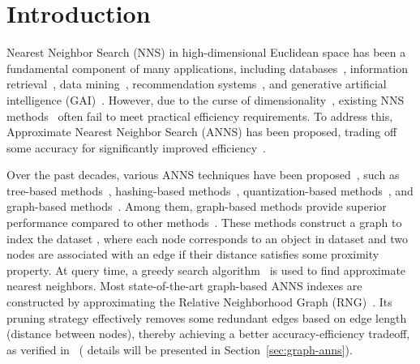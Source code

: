 \section{Introduction}
\label{sec:intro}
Nearest Neighbor Search (NNS) in high-dimensional Euclidean space has been a fundamental component of many applications, including {\cheng databases~\cite{milvus2021, pan2024vector}}, information retrieval~\cite{ANNForIR, ANNForDPR}, data mining~\cite{ANNForDM}, recommendation systems~\cite{ANNForRS}, and generative artificial intelligence (GAI)~\cite{zhao2024retrievalaugmented}. However, due to the curse of dimensionality~\cite{curse1, curse2}, existing NNS methods~\cite{Jagadishidistance2005} often fail to meet practical efficiency requirements. To address this, Approximate Nearest Neighbor Search (ANNS) has been proposed, %
trading off some accuracy for significantly improved efficiency~\cite{li2020improving}.
%

Over the past decades, various ANNS techniques have been proposed~\cite{arora2018hdindex, BeygelzimerKL06Covertree, RamS19kdtree,wangSurveyLearningHash2018, hash2014survey, jegouProductQuantizationNearest2011, gongIterativeQuantizationProcrustean2013, DBLP:journals/pami/GeHK014,gao2024rabitq,wang2021comprehensive}, such as tree-based methods~\cite{arora2018hdindex, BeygelzimerKL06Covertree, RamS19kdtree}, hashing-based methods~\cite{wangSurveyLearningHash2018, hash2014survey}, quantization-based methods~\cite{jegouProductQuantizationNearest2011, gongIterativeQuantizationProcrustean2013, DBLP:journals/pami/GeHK014,gao2024rabitq}, and graph-based methods~\cite{wang2021comprehensive,fu2019fast,DBLP:journals/pami/FuWC22,DBLP:journals/is/MalkovPLK14,DBLP:conf/cvpr/HarwoodD16,malkovEfficientRobustApproximate2020}. %
Among them, graph-based methods provide superior performance compared to other methods~\cite{wang2021comprehensive,liApproximateNearestNeighbor2020}. %
These methods construct a graph %
to index the dataset%
, where each node %
corresponds to an object in dataset %
and two nodes are associated with an edge if their distance satisfies some proximity property. %
At query time, a greedy search algorithm~\cite{fu2019fast,malkovEfficientRobustApproximate2020,wang2021comprehensive} is used to find approximate nearest neighbors. %
Most state-of-the-art graph-based ANNS indexes are constructed by approximating
the Relative Neighborhood Graph (RNG)~\cite{rng}. Its pruning strategy effectively removes some redundant edges based on edge length (distance between nodes), thereby achieving a better accuracy-efficiency tradeoff, as verified in~\cite{wang2021comprehensive} ({%
details will be presented} in Section~\ref{sec:graph-anns}). 


